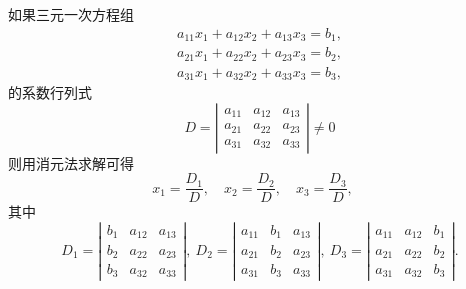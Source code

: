\documentclass[10pt,a4paper%
tablecaptionabove]{article}
\begin{document}
\begin{CJK}{UTF8}{gkai}
  如果三元一次方程组
  $$
  \begin{array}{c}  
    a_{11}x_1 + a_{12}x_2 + a_{13}x_3 = b_1, \\
    a_{21}x_1 + a_{22}x_2 + a_{23}x_3 = b_2, \\
    a_{31}x_1 + a_{32}x_2 + a_{33}x_3 = b_3,
  \end{array}
  $$
  的系数行列式
  $$
  D = \left|
    \begin{array}{ccc}
      a_{11} & a_{12} & a_{13}\\
      a_{21} & a_{22} & a_{23}\\
      a_{31} & a_{32} & a_{33}
    \end{array}
  \right| \ne 0
  $$
  则用消元法求解可得
  $$
  x_1 = \frac{D_1}{D}, \quad
  x_2 = \frac{D_2}{D}, \quad
  x_3 = \frac{D_3}{D}, \quad
  $$
  其中
  $$
  D_1 = \left|
    \begin{array}{ccc}
      b_1 & a_{12} & a_{13}\\
      b_2 & a_{22} & a_{23}\\
      b_3 & a_{32} & a_{33}
    \end{array}
  \right|, \
  D_2 = \left|
    \begin{array}{ccc}
      a_{11} & b_1 & a_{13}\\
      a_{21} & b_2 & a_{23}\\
      a_{31} & b_3 & a_{33}
    \end{array}
  \right|, \
  D_3= \left|
    \begin{array}{ccc}
      a_{11} & a_{12} & b_1 \\
      a_{21} & a_{22} & b_2 \\
      a_{31} & a_{32} & b_3 
    \end{array}
  \right|.
  $$


\end{CJK}
\end{document}
